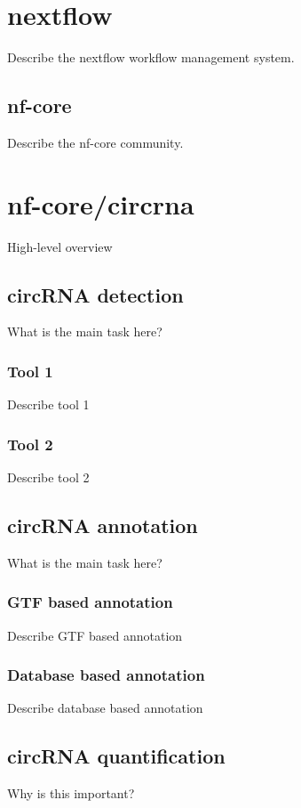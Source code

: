 \section{nextflow}
Describe the nextflow workflow management system.

\subsection{nf-core}
Describe the nf-core community.

\section{nf-core/circrna}
High-level overview

\subsection{circRNA detection}
What is the main task here?

\subsubsection{Tool 1}
Describe tool 1

\subsubsection{Tool 2}
Describe tool 2

\subsection{circRNA annotation}
What is the main task here?

\subsubsection{GTF based annotation}
Describe GTF based annotation

\subsubsection{Database based annotation}
Describe database based annotation

\subsection{circRNA quantification}

Why is this important?

